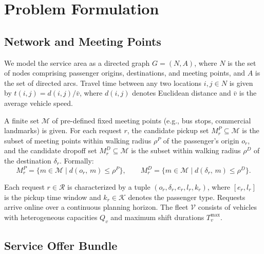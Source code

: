 
\section{Problem Formulation}\label{sec:model}

\subsection{Network and Meeting Points}

We model the service area as a directed graph $G = (N, A)$, where $N$ is the set of nodes
comprising passenger origins, destinations, and meeting points, and $A$ is the set of
directed arcs. Travel time between any two locations $i, j \in N$ is given by
$t(i,j) = d(i,j) / \bar{v}$, where $d(i,j)$ denotes Euclidean distance and $\bar{v}$ is
the average vehicle speed.

A finite set $\mathcal{M}$ of pre-defined fixed meeting points (e.g., bus stops, commercial
landmarks) is given. For each request $r$, the candidate pickup set
$M_r^P \subseteq \mathcal{M}$ is the subset of meeting points within walking radius $\rho^P$
of the passenger's origin $o_r$, and the candidate dropoff set
$M_r^D \subseteq \mathcal{M}$ is the subset within walking radius $\rho^D$ of the destination
$\delta_r$. Formally:
\begin{equation}
  M_r^P = \bigl\{ m \in \mathcal{M} \mid d(o_r,\, m) \leq \rho^P \bigr\},
  \qquad
  M_r^D = \bigl\{ m \in \mathcal{M} \mid d(\delta_r,\, m) \leq \rho^D \bigr\}.
\end{equation}

Each request $r \in \mathcal{R}$ is characterized by a tuple $(o_r, \delta_r, e_r, l_r, k_r)$,
where $[e_r, l_r]$ is the pickup time window and $k_r \in \mathcal{K}$ denotes the passenger
type. Requests arrive online over a continuous planning horizon. The fleet $\mathcal{V}$
consists of vehicles with heterogeneous capacities $Q_v$ and maximum shift durations
$T_v^{\max}$.

\subsection{Service Offer Bundle}

